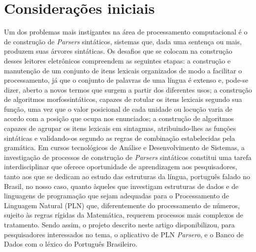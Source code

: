 \documentclass[portuguese]{textolivre}
\begin{document}
\section{Considerações iniciais}\label{sec-intro}
Um dos problemas mais instigantes na área de processamento computacional é o de construção de \textit{Parsers} sintáticos, sistemas que, dada uma sentença ou mais, produzem suas árvores sintáticas. Os desafios que se colocam na construção desses leitores eletrônicos compreendem as seguintes etapas: a construção e manutenção de um conjunto de itens lexicais organizados de modo a facilitar o processamento, já que o conjunto de palavras de uma língua é extenso e, pode-se dizer, aberto a novos termos que surgem a partir dos diferentes usos; a construção de algoritmos morfossintáticos, capazes de rotular os itens lexicais segundo sua função, uma vez que o valor posicional de cada unidade ou locução varia de acordo com a posição que ocupa nos enunciados; a construção de algoritmos capazes de agrupar os itens lexicais em sintagmas, atribuindo-lhes as funções sintáticas e validando-os segundo as regras de combinação estabelecidas pela gramática. Em cursos tecnológicos de Análise e Desenvolvimento de Sistemas, a investigação de processos de construção de \textit{Parsers} sintáticos constitui uma tarefa interdisciplinar que oferece oportunidade de aprendizagem aos pesquisadores, tanto aos que se dedicam ao estudo das estruturas da língua, português falado no Brasil, no nosso caso, quanto àqueles que investigam estruturas de dados e de linguagens de programação que sejam adequadas para o Processamento de Linguagem Natural (PLN) que, diferentemente do processamento de números, sujeito às regras rígidas da Matemática, requerem processos mais complexos de tratamento. Sendo assim, o projeto descrito neste artigo disponibilizou, para pesquisadores interessados no tema, o aplicativo de PLN \textit{Parsero}, e o Banco de Dados com o léxico do Português Brasileiro.
\end{document}
